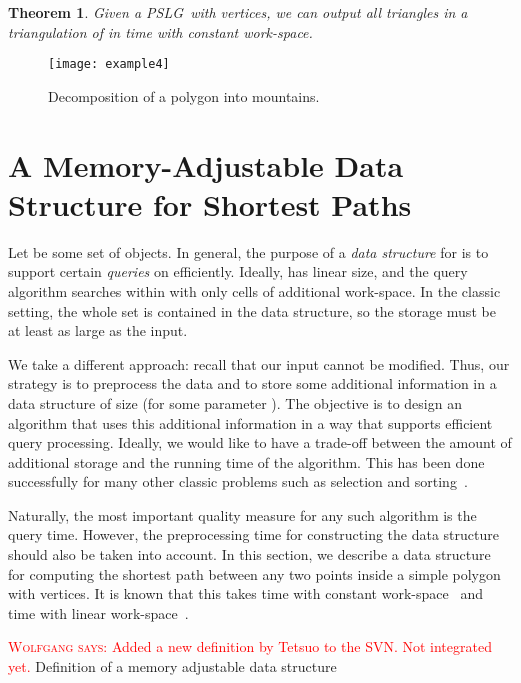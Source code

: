 \documentclass[11pt,a4paper]{article}
\newtheorem{theorem}{Theorem}[section]
\newcommand{\histogram}{mountain}
\newcommand{\pslg}{PSLG}
\newcommand{\marrow}{\marginpar[\hfill]{}}
\newcommand{\niceremark}[4]
   {\textcolor{#4}{\textsc{#1 #2:} \marrow\textsf{#3}}}
\newcommand{\wolfgang}[2][says]{\niceremark{Wolfgang}{#1}{#2}{red}}
\begin{document}
\begin{theorem}
Given a \pslg\  with  vertices,
we can output all triangles in a triangulation of  in 
time with constant work-space.
\end{theorem}

\begin{figure}
\begin{center}
\texttt{[image: example4]}
\end{center}
\caption{Decomposition of a polygon into \histogram s.}
\label{fig:histo_decomp}
\end{figure}


\section{A Memory-Adjustable Data Structure for Shortest Paths}\label{sec:memadj}

Let  be some set of  objects.
In general, the purpose of a \emph{data structure}  for
 is to support certain \emph{queries} on
 efficiently.
Ideally,  has linear size,
and the query algorithm searches within  with only  cells of
additional work-space.
In the classic setting, the whole set  is contained in the
data structure,
so the storage must be at least as large as the input.


We take a different approach: recall that our input
cannot be modified. Thus, our strategy is to
preprocess the data and to store some additional information
in a data structure of size  (for some parameter ).
The objective is to design an algorithm that uses this additional
information in a way that supports efficient query processing.
Ideally, we would like to have a trade-off between the amount of additional
storage and the running time of the algorithm. This has been done
successfully for many other classic problems such as selection and
sorting~\cite{MunroRa96,RamanRa98}.


Naturally, the most important quality measure for any such algorithm is the
query time. However, the preprocessing
time for constructing the data structure should also be taken into account. In
this section, we describe a data structure for computing the shortest path
between any two points inside a simple polygon  with  vertices.
It is known that this takes  time with constant
work-space~\cite{AsanoMuRoWa11}  and  time  with
linear work-space~\cite{GuiHers89}.

\iffalse
\wolfgang{Added a new definition by Tetsuo to the SVN. Not integrated yet.}
Definition of a memory adjustable data structure
\end{document}
